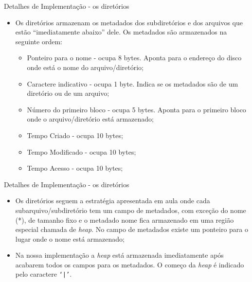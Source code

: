 \documentclass[10pt]{beamer}
\begin{document}
    \begin{frame}{Detalhes de Implementação - os diretórios}
        \begin{itemize}
            \justifying
            \item Os diretórios armazenam os metadados dos subdiretórios e dos
                arquivos que estão ``imediatamente abaixo'' dele. Os
                metadados são armazenados na seguinte ordem:
            \begin{itemize}
                \justifying
                \item Ponteiro para o nome - ocupa 8 bytes. Aponta para o
                    endereço do disco onde está o nome do arquivo/diretório;
                \item Caractere indicativo - ocupa 1 byte. Indica se os
                    metadados são de um diretório ou de um arquivo;
                \item Número do primeiro bloco - ocupa 5 bytes. Aponta para o
                    primeiro bloco onde o arquivo/diretório está armazenado;
                \item Tempo Criado - ocupa 10 bytes;
                \item Tempo Modificado - ocupa 10 bytes;
                \item Tempo Acesso - ocupa 10 bytes;
            \end{itemize}
        \end{itemize}
    \end{frame}
    \begin{frame}{Detalhes de Implementação - os diretórios}
        \begin{itemize}
            \justifying
            \begin{itemize}
                \justifying
                \item Tamanho - ocupa 8 bytes. Se os metadados são de um
                    diretório, então esse valor é sempre 0;
                \item Nome* - ocupa um número variado de bytes. Ao fim do nome
                    estará o caractere \texttt{`|'}.
            \end{itemize}
            \item Os diretórios seguem a estratégia apresentada em aula onde
                cada subarquivo/subdiretório tem um campo de metadados, com
                exceção do nome (*), de tamanho fixo e o metadado nome fica
                armazenado em uma região especial chamada de \textit{heap}. No
                campo de metadados existe um ponteiro para o lugar onde o nome
                está armazenado;
            \item Na nossa implementação a \textit{heap} está armazenada
                imediatamente após acabarem todos os campos para os metadados.
                O começo da \textit{heap} é indicado pelo caractere
                \texttt{`|'}.
        \end{itemize}
    \end{frame}
\end{document}
